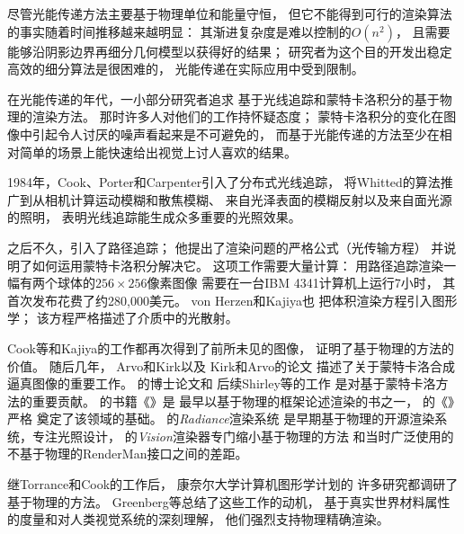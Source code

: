 尽管光能传递方法主要基于物理单位和能量守恒，
但它不能得到可行的渲染算法的事实随着时间推移越来越明显：
其渐进复杂度是难以控制的$O(n^2)$，
且需要能够沿阴影边界再细分几何模型以获得好的结果；
研究者为这个目的开发出稳定高效的细分算法是很困难的，
光能传递在实际应用中受到限制。

在光能传递的年代，一小部分研究者追求
基于光线追踪和蒙特卡洛积分的基于物理的渲染方法。
那时许多人对他们的工作持怀疑态度；
蒙特卡洛积分的变化在图像中引起令人讨厌的噪声看起来是不可避免的，
而基于光能传递的方法至少在相对简单的场景上能快速给出视觉上讨人喜欢的结果。

1984年，Cook、Porter和Carpenter\parencite*{10.1145/800031.808590}引入了分布式光线追踪，
将Whitted的算法推广到从相机计算运动模糊和散焦模糊、
来自光泽表面的模糊反射以及来自面光源的照明，
表明光线追踪能生成众多重要的光照效果。

之后不久，\citet{10.1145/15922.15902}引入了路径追踪；
他提出了渲染问题的严格公式（光传输方程）
并说明了如何运用蒙特卡洛积分解决它。
这项工作需要大量计算：
用路径追踪渲染一幅有两个球体的$256\times256$像素图像
需要在一台IBM 4341计算机上运行7小时，
其首次发布花费了约280,000美元\citep{farmer1981comparing}。
von Herzen和Kajiya\parencite*{10.1145/800031.808594}也
把体积渲染方程引入图形学；
该方程严格描述了介质中的光散射。

Cook等和Kajiya的工作都再次得到了前所未见的图像，
证明了基于物理的方法的价值。
随后几年， Arvo和Kirk\parencite*{10.1145/97879.97886}以及
Kirk和Arvo\parencite*{10.1145/122718.122735}的论文
描述了关于蒙特卡洛合成逼真图像的重要工作。
\citeauthor{10.5555/124947}的博士论文\parencite*{10.5555/124947}和
后续Shirley等\parencite*{10.1145/226150.226151}的工作
是对基于蒙特卡洛方法的重要贡献。
\citeauthor{10.5555/63450}的书籍《》\parencite*{10.5555/63450}是
最早以基于物理的框架论述渲染的书之一，
\citeauthor{10.5555/527570}的《》\parencite*{10.5555/527570}严格
奠定了该领域的基础。
\citeauthor{10.1145/192161.192286}的\emph{Radiance}渲染系统
是早期基于物理的开源渲染系统，专注光照设计\citep{10.1145/192161.192286}，
\citeauthor{slusallek1996vision}的\emph{Vision}渲染器专门缩小基于物理的方法
和当时广泛使用的不基于物理的RenderMan接口之间的差距\citep{slusallek1996vision}。

继Torrance和Cook的工作后，
康奈尔大学计算机图形学计划的
许多研究都调研了基于物理的方法。
Greenberg等\parencite*{10.1145/258734.258914}总结了这些工作的动机，
基于真实世界材料属性的度量和对人类视觉系统的深刻理解，
他们强烈支持物理精确渲染。

